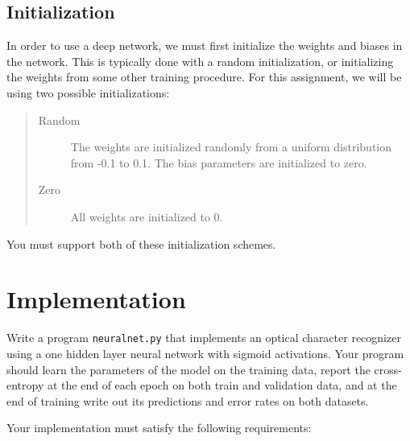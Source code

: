 \documentclass[11pt,addpoints,answers]{exam}
\begin{document}
\subsection{Initialization}
\label{sec:init}

In order to use a deep network, we must first initialize the weights and biases in the network. This is typically done with a random initialization, or initializing the weights from some other training procedure. For this assignment, we will be using two possible initializations: 
\begin{quote}
\begin{description}
\item[{\sc Random}] The weights are initialized randomly from a uniform distribution from -0.1 to 0.1. The bias parameters are initialized to zero.
\item[{\sc Zero}] All weights are initialized to 0.  
\end{description}
\end{quote}

You must support both of these initialization schemes.

\section{Implementation}

Write a program \texttt{neuralnet.py} that implements an optical character recognizer using a one hidden layer neural network with sigmoid activations. Your program should learn the parameters of the model on the training data, report the cross-entropy at the end of each epoch on both train and validation data, and at the end of training write out its predictions and error rates on both datasets. 

Your implementation must satisfy the following requirements:
\end{document}
